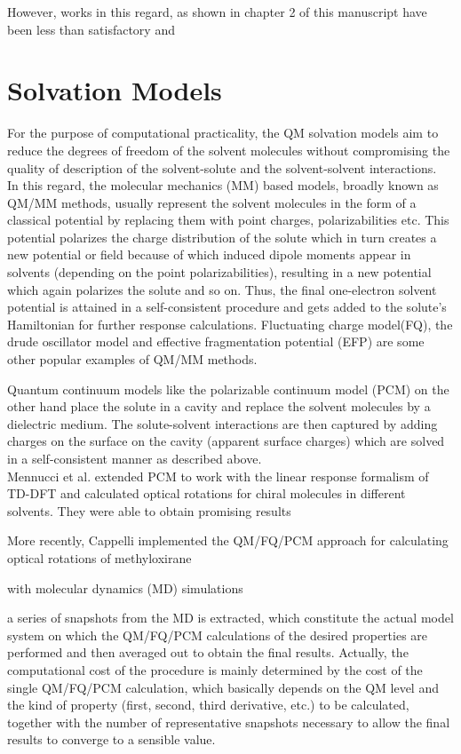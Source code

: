 However, works in this regard, as shown in chapter 2 of this manuscript have been less than satisfactory and 

\section{Solvation Models}
For the purpose of computational practicality, the QM solvation models aim to reduce the degrees of freedom of
the solvent molecules without compromising the quality of description of the solvent-solute and the solvent-solvent
interactions. \\
In this regard, the molecular mechanics (MM) based models, broadly known as QM/MM methods, usually represent the
solvent molecules in the form of a classical potential by replacing them with point charges, polarizabilities etc.\cite{}
This potential polarizes the charge distribution of the solute which in turn creates a new potential or field because of
which induced dipole moments appear in solvents (depending on the point polarizabilities), resulting in a new
potential which again polarizes the solute and so on. Thus, the final one-electron solvent potential is attained in a
self-consistent procedure and gets added to the solute's Hamiltonian for further response calculations. Fluctuating
charge model(FQ)\cite{}, the drude oscillator model\cite{} and effective fragmentation potential (EFP)\cite{} are some
other popular examples of QM/MM methods.

Quantum continuum models like the polarizable continuum model (PCM)\cite{}
on the other hand place the solute in a cavity and replace the solvent molecules by a dielectric medium. The
solute-solvent interactions are then captured by adding charges on the surface on the cavity (apparent surface charges)
which are solved in a self-consistent manner as described above.\\


Mennucci et al. extended PCM to work with the linear response formalism of TD-DFT\cite{Mennucci02}
and calculated optical rotations for chiral molecules in different solvents. They were able to obtain promising results

More recently, Cappelli implemented the
QM/FQ/PCM approach for calculating optical rotations of methyloxirane


with molecular dynamics (MD) simulations



 a series of snapshots from the MD is extracted, which constitute the actual model system on which the QM/FQ/PCM calculations of the desired properties are performed and then averaged out to obtain the final results. Actually, the computational cost of the procedure is mainly determined by the cost of the single QM/FQ/PCM calculation, which basically depends on the QM level and the kind of property (first, second, third derivative, etc.) to be calculated, together with the number of representative snapshots necessary to allow the final results to converge to a sensible value.



